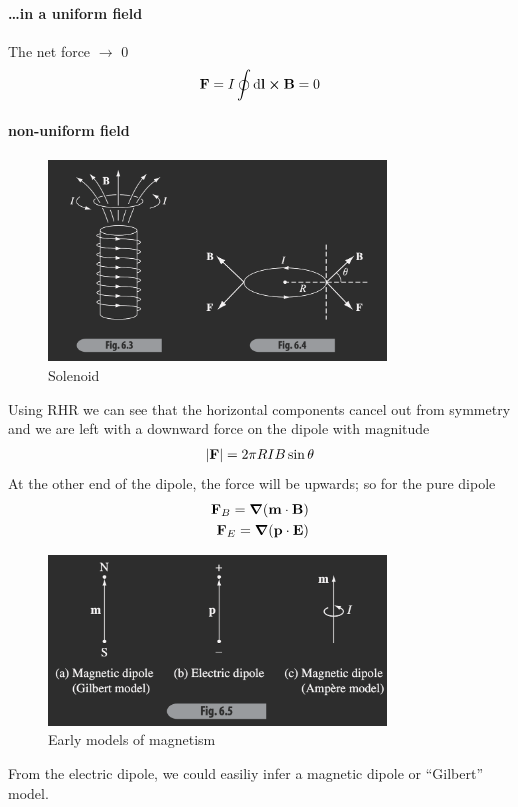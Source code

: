 \documentclass[../main.tex]{subfiles}
\begin{document}
\paragraph{\dots in a uniform field} The net force $\to$ 0
\begin{align*}
    \vb F = I \oint \dd{\vb l} \cross \vb B = 0
\end{align*}

\newpage
\paragraph{non-uniform field}
\begin{figure}[ht]
    \centering
    \includegraphics[width=0.8\textwidth]{fig6_3_4.png}
    \caption{Solenoid}
    \label{fig:gr6_3}
\end{figure}

Using RHR we can see that the horizontal components cancel out from symmetry and we are left with a
downward force on the dipole with magnitude
\begin{align*}
    \abs{\vb F} = 2\pi R I B \sin\theta
\end{align*} At the other end of the dipole, the force will be upwards;
so for the pure dipole
\begin{align*}
    \vb F_B = \grad (\vb m \cdot \vb B) \\
    \vb F_E = \grad (\vb p \cdot \vb E)
\end{align*}

\begin{figure}[ht]
    \centering
    \includegraphics[width=0.8\textwidth]{fig6_5.png}
    \caption{Early models of magnetism}
    \label{fig:gr6_5}
\end{figure}
From the electric dipole, we could easiliy infer a magnetic dipole or ``Gilbert'' model.
\end{document}
